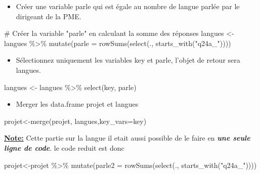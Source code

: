 \documentclass[
  letterpaper,
  DIV=11,
  numbers=noendperiod]{scrartcl}
\newenvironment{Shaded}{\begin{snugshade}}{\end{snugshade}}
\newcommand{\AttributeTok}[1]{\textcolor[rgb]{0.40,0.45,0.13}{#1}}
\newcommand{\CommentTok}[1]{\textcolor[rgb]{0.37,0.37,0.37}{#1}}
\newcommand{\FunctionTok}[1]{\textcolor[rgb]{0.28,0.35,0.67}{#1}}
\newcommand{\NormalTok}[1]{\textcolor[rgb]{0.00,0.23,0.31}{#1}}
\newcommand{\OtherTok}[1]{\textcolor[rgb]{0.00,0.23,0.31}{#1}}
\newcommand{\SpecialCharTok}[1]{\textcolor[rgb]{0.37,0.37,0.37}{#1}}
\newcommand{\StringTok}[1]{\textcolor[rgb]{0.13,0.47,0.30}{#1}}
\providecommand{\tightlist}{%
  \setlength{\itemsep}{0pt}\setlength{\parskip}{0pt}}\usepackage{longtable,booktabs,array}
\begin{document}
\begin{itemize}
\tightlist
\item
  Créer une variable parle qui est égale au nombre de langue parlée par
  le dirigeant de la PME.
\end{itemize}

\begin{Shaded}
\begin{Highlighting}[]
\CommentTok{\# Créer la variable "parle" en calculant la somme des réponses}
\NormalTok{langues }\OtherTok{\textless{}{-}}\NormalTok{ langues }\SpecialCharTok{\%\textgreater{}\%} 
                \FunctionTok{mutate}\NormalTok{(}\AttributeTok{parle =} \FunctionTok{rowSums}\NormalTok{(}\FunctionTok{select}\NormalTok{(., }\FunctionTok{starts\_with}\NormalTok{(}\StringTok{"q24a\_"}\NormalTok{))))}
\end{Highlighting}
\end{Shaded}

\begin{itemize}
\tightlist
\item
  Sélectionnez uniquement les variables key et parle, l'objet de retour
  sera langues.
\end{itemize}

\begin{Shaded}
\begin{Highlighting}[]
\NormalTok{langues }\OtherTok{\textless{}{-}}\NormalTok{ langues }\SpecialCharTok{\%\textgreater{}\%} 
                \FunctionTok{select}\NormalTok{(key, parle)}
\end{Highlighting}
\end{Shaded}

\begin{itemize}
\tightlist
\item
  Merger les data.frame projet et langues
\end{itemize}

\begin{Shaded}
\begin{Highlighting}[]
\NormalTok{projet}\OtherTok{\textless{}{-}}\FunctionTok{merge}\NormalTok{(projet, langues,}\AttributeTok{key\_vars=}\NormalTok{key)}
\end{Highlighting}
\end{Shaded}

\ul{\textbf{Note:}} Cette partie sur la langue il etait aussi possible
de le faire en \textbf{\emph{une seule ligne de code}}. le code reduit
est donc\\

\begin{Shaded}
\begin{Highlighting}[]
\NormalTok{projet}\OtherTok{\textless{}{-}}\NormalTok{projet }\SpecialCharTok{\%\textgreater{}\%} 
            \FunctionTok{mutate}\NormalTok{(}\AttributeTok{parle2 =} \FunctionTok{rowSums}\NormalTok{(}\FunctionTok{select}\NormalTok{(., }\FunctionTok{starts\_with}\NormalTok{(}\StringTok{"q24a\_"}\NormalTok{))))}
\end{Highlighting}
\end{Shaded}
\end{document}
